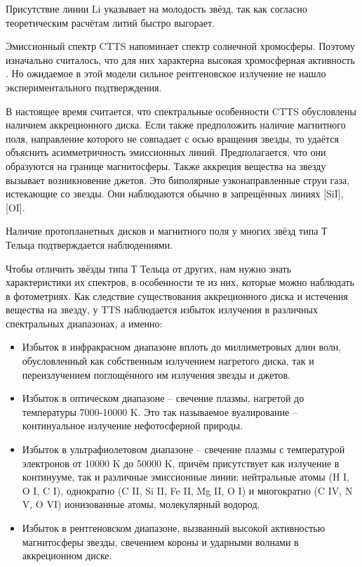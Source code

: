 Присутствие линии Li указывает на молодость звёзд, так как согласно теоретическим расчётам литий быстро выгорает.

Эмиссионный спектр CTTS напоминает спектр солнечной хромосферы. Поэтому изначально считалось, что для них характерна высокая хромосферная активность \cite{krav2004}. Но ожидаемое в этой модели сильное рентгеновское излучение не нашло экспериментального подтверждения.

В настоящее время считается, что спектральные особенности CTTS обусловлены наличием аккреционного диска. Если также предположить наличие магнитного поля, направление которого не совпадает с осью вращения звезды, то удаётся объяснить асимметричность эмиссионных линий. Предполагается, что они образуются на границе магнитосферы. Также аккреция вещества на звезду вызывает возникновение джетов. Это биполярные узконаправленные струи газа, истекающие со звезды. Они наблюдаются обычно в запрещённых линиях [SiI], [OI].

Наличие протопланетных дисков и магнитного поля у многих звёзд типа Т Тельца подтверждается наблюдениями.

Чтобы отличить звёзды типа Т Тельца от других, нам нужно знать характеристики их спектров, в особенности те из них, которые можно наблюдать в фотометриях. Как следствие существования аккреционного диска и истечения вещества на звезду, у TTS наблюдается избыток излучения в различных спектральных диапазонах, а именно:
\begin{itemize}
	\item Избыток в инфракрасном диапазоне вплоть до миллиметровых длин волн, обусловленный как собственным излучением нагретого диска, так и переизлучением поглощённого им излучения звезды и джетов.
	\item Избыток в оптическом диапазоне – свечение плазмы, нагретой до температуры 7000-10000 K. Это так называемое вуалирование -- континуальное излучение нефотосферной природы. 
	\item Избыток в ультрафиолетовом диапазоне -- свечение плазмы с температурой электронов от 10000 K до 50000 K, причём присутствует как излучение в континууме, так и различные эмиссионные линии: нейтральные атомы (H I, O I, C I), однократно (C II, Si II, Fe II, Mg II, O I) и многократно (C IV, N V, O VI) ионизованные атомы, молекулярный водород.
	\item Избыток в рентгеновском диапазоне, вызванный высокой активностью магнитосферы звезды, свечением короны и ударными волнами в аккреционном диске.
\end{itemize}

